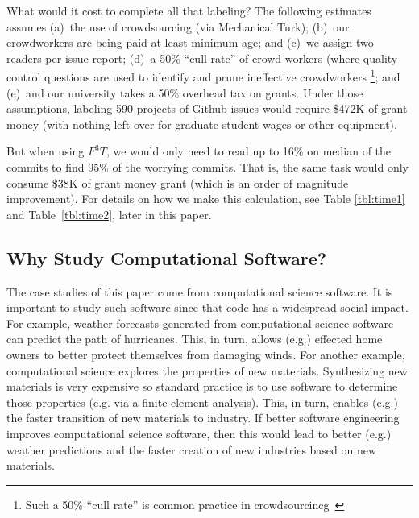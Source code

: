 \documentclass[10pt,journal,compsoc]{IEEEtran}
\begin{document}

What would it cost to complete all that labeling? The following estimates assumes
(a)~the   use of  crowdsourcing (via  Mechanical Turk);
(b)~our crowdworkers are being paid at least minimum age; and 
(c)~we assign two readers per issue report; 
(d)~a 50\% ``cull rate'' of crowd workers (where quality control questions are used to identify and prune  ineffective crowdworkers \footnote{Such a 50\% ``cull rate'' is common practice in crowdsourcincg~\cite{chen19}};
and (e)~and our university takes a 50\% overhead tax on grants. Under those assumptions,
 labeling 590 projects of Github issues would require  \$472K  of  grant money (with nothing left over for graduate student wages or other equipment).


But when using  $F^3T$, 
we would only need to read up to 16\% on median of the commits to find 95\% of the worrying commits.
That is, the same task would only consume  \$38K of grant money grant (which is an order of magnitude improvement). For details on how we make this calculation, see Table \ref{tbl:time1} and Table~\ref{tbl:time2}, later in this paper.

\subsection{Why Study Computational Software?}

The case studies of this paper come from computational science software. It is important to study such software since that code    has a widespread social impact.
For example, weather forecasts generated from computational science
software can   predict the path of hurricanes. This, in turn,
allows (e.g.) effected home owners to better protect themselves from
damaging winds. 
For another example, computational science explores the properties
of new materials. Synthesizing new materials is very expensive so standard practice is to use software to determine
those properties (e.g. via a finite element analysis). This, in turn, enables (e.g.) the faster transition of new materials to industry.
If better software engineering    improves computational
science software, then this would lead to better (e.g.) weather predictions and the faster creation of new industries based on new materials.
\end{document}
